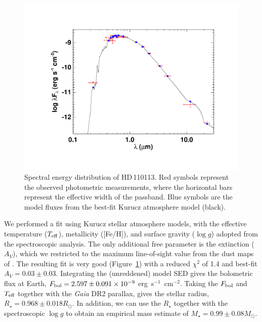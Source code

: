 \documentclass[fleqn,usenatbib]{mnras}
\newcommand{\Tstar}{HD\,110113}
\begin{document}
\begin{figure}
    \centering
    \includegraphics[width=\linewidth,trim=100 75 95 95,clip]{toi_755_sed.pdf}
    \caption{Spectral energy distribution of \Tstar. Red symbols represent the observed photometric measurements, where the horizontal bars represent the effective width of the passband. Blue symbols are the model fluxes from the best-fit Kurucz atmosphere model (black).}
    \label{fig:sed}
\end{figure}

We performed a fit using Kurucz stellar atmosphere models, with the effective temperature ($T_{\rm eff}$), metallicity ([Fe/H]), and surface gravity ($\log g$) adopted from the spectroscopic analysis. The only additional free parameter is the extinction ($A_V$), which we restricted to the maximum line-of-sight value from the dust maps of \citet{Schlegel:1998}. The resulting fit is very good (Figure~\ref{fig:sed}) with a reduced $\chi^2$ of 1.4 and best-fit $A_V = 0.03 \pm 0.03$. Integrating the (unreddened) model SED gives the bolometric flux at Earth, $F_{\rm bol} = 2.597 \pm 0.091 \times 10^{-9}$ erg~s$^{-1}$~cm$^{-2}$. Taking the $F_{\rm bol}$ and $T_{\rm eff}$ together with the {\it Gaia\/} DR2 parallax, gives the stellar radius, $R_\star = 0.968 \pm 0.018 R_\odot$. In addition, we can use the $R_\star$ together with the spectroscopic $\log g$ to obtain an empirical mass estimate of $M_\star = 0.99 \pm 0.08 M_\odot$.
\end{document}
